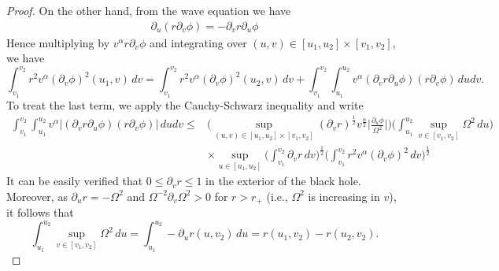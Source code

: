 \documentclass[12 pt, reqno]{amsart}
\theoremstyle{definition}
\theoremstyle{remark}
\numberwithin{equation}{section}
\newcommand{\abs}[1]{\vert#1\vert}
\newcommand{\ud}{d}
\newcommand{\rd}{\partial}
\newcommand{\bb}{\Big}
\newcommand{\0}{\emptyset}
\newcommand{\alp}{\alpha}
\newcommand{\lmb}{\lambda}
\newcommand{\Omg}{\Omega}
\newcommand{\dur}{\nu}
\newcommand{\dvr}{\lmb}
\newcommand{\f}{\frac}
\begin{document}
\begin{proof}
On the other hand, from the wave equation we have
\begin{align*}
	\rd_{u} (r \rd_{v} \phi) 
	= - \rd_v r \rd_{u} \phi
\end{align*}
Hence multiplying by $v^{\alp} r \rd_{v} \phi$ and integrating over $(u,v) \in [u_{1}, u_{2}] \times [v_{1}, v_{2}]$, we have
\begin{equation} \label{eq:red-shift:rdvphi}
	\int_{v_{1}}^{v_{2}} r^{2}  v^{\alp} (\rd_{v} \phi)^{2}(u_{1}, v) \, \ud v
	=  \int_{v_{1}}^{v_{2}} r^{2} v^{\alp} (\rd_{v} \phi)^{2}(u_{2}, v) \, \ud v 
		+ \int_{v_{1}}^{v_{2}} \int_{u_{1}}^{u_{2}} v^{\alp} (\rd_v r \rd_{u} \phi) (r \rd_{v} \phi) \, \ud u \ud v.
\end{equation}
To treat the last term, we apply the Cauchy-Schwarz inequality and write
\begin{align*}
\int_{v_{1}}^{v_{2}} \int_{u_{1}}^{u_{2}} v^{\alp} \abs{(\rd_{v} r \rd_{u} \phi) (r \rd_{v} \phi)} \, \ud u \ud v	
\leq &
\bb(\sup_{(u, v) \in [u_{1}, u_{2}] \times [v_{1}, v_{2}]} (\rd_v r)^{\f 12} v^{\frac{\alp}{2}} \abs{\frac{\rd_{u} \phi}{\Omg^{2}}} \bb)  \bb( \int_{u_{1}}^{u_{2}} \sup_{v \in [v_{1}, v_{2}]} \Omg^{2}  \, \ud u \bb)  \\
& \times  \sup_{u \in [u_{1}, u_{2}]} 
	\bb( \int_{v_{1}}^{v_{2}} \rd_v r \, \ud v \bb)^{\frac{1}{2}} 
	\bb( \int_{v_{1}}^{v_{2}} r^{2} v^{\alp} (\rd_{v} \phi)^{2} \, \ud v \bb)^{\frac{1}{2}}
\end{align*}
It can be easily verified that $0 \leq \rd_v r \leq 1$ in the exterior of the black hole. Moreover, as $\rd_u r = -\Omg^{2}$ and $\Omg^{- 2} \rd_{v} \Omg^{2}  > 0$ for $r > r_{+}$ (i.e., $\Omg^2$ is increasing in $v$), it follows that
\begin{equation*}
	\int_{u_{1}}^{u_{2}} \sup_{v \in [v_{1}, v_{2}]} \Omg^{2}  \, \ud u 
	= \int_{u_{1}}^{u_{2}} - \rd_u r (u, v_{2}) \, \ud u
	= r(u_{1}, v_{2}) - r(u_{2}, v_{2}).
\end{equation*}

\end{proof}
\end{document}
